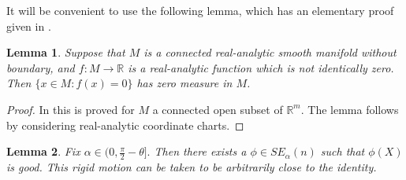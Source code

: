 \documentclass[11pt,reqno,twoside]{amsart}
\newtheorem{lemma}{Lemma}
\theoremstyle{definition}
\begin{document}
It will be convenient to use the following lemma, which has an elementary proof given in \cite{mityagin2015zerosetrealanalytic}.

\begin{lemma} \label{real-analytic-vanish}
    Suppose that $M$ is a connected real-analytic smooth manifold without boundary, and $f: M \to \mathbb{R}$ is a real-analytic function which is not identically zero. Then $\{x \in M: f(x) = 0\}$ has zero measure in $M$.
\end{lemma}
\begin{proof}
    In \cite{mityagin2015zerosetrealanalytic} this is proved for $M$ a connected open subset of $\mathbb{R}^m$. The lemma follows by considering real-analytic coordinate charts.
\end{proof}


\begin{lemma} \label{get-good}
    Fix $\alpha \in (0,\frac{\pi}{2}-\theta].$ Then there exists a $\phi \in SE_\alpha(n)$ such that $\phi(X)$ is good. This rigid motion can be taken to be arbitrarily close to the identity.
\end{lemma}
\end{document}
